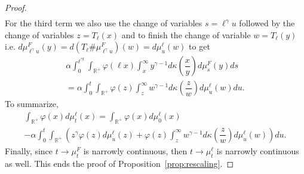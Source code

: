 \documentclass[10pt,a4paper]{amsart}
\numberwithin{equation}{section}
\newcommand*\dst{\displaystyle}
\renewcommand*\a{\alpha}
\newcommand*\R{\mathbb{R}}
\begin{document}
\begin{proof}
\begin{align*}
\end{align*}
For the third term we also use the change of variables $s=\ell^{\gamma}u$ followed by the change of variables $z=T_{\ell}(x)$ and to finish the change of variable $w=T_\ell (y)$ i.e. $d\mu_{\ell^{\gamma}u}^{F}(y)= d (T_{\ell} \#\mu_{\ell^{\gamma}u}^{F})(w)=d\mu_u^\ell(w)$ to get
\begin{multline*}
\a \dst\int_0^{\ell^{\gamma t}} \dst\int_{\R^+}
\varphi(\ell x)\dst\int_x^{\infty}y^{\gamma-1} d\kappa\left(\dfrac{x}{y}\right)d\mu_s^{F}(y)ds \\
=\a \dst\int_0^{t} \dst\int_{\R^+}
\varphi(z)\dst\int_z^{\infty}w^{\gamma-1} d\kappa\left(\dfrac{z}{w}\right)d\mu_u^{\ell}(w)du.
\end{multline*}
To summarize,
\begin{multline*}
\dst\int_{\R^+} \varphi(x) d\mu_t^{\ell}(x) =
\dst\int_{\R^+} \varphi(x) d\mu_0^{\ell}(x)\\
-\a \dst\int_0^{t} \dst\int_{\R^+}
\left(z^{\gamma} \varphi(z)d\mu_u^{\ell}(z)+
\varphi(z)\dst\int_z^{\infty}w^{\gamma-1} d\kappa\left(\dfrac{z}{w}\right)d\mu_u^{\ell}(w) \right)du.
\end{multline*}
Finally, since $t\to \mu_t^{F}$ is narrowly continuous, then $t\to \mu_t^{\ell}$ is narrowly continuous as well. This ends the proof of Proposition~\ref{prop:rescaling}.
\end{proof}
\end{document}
